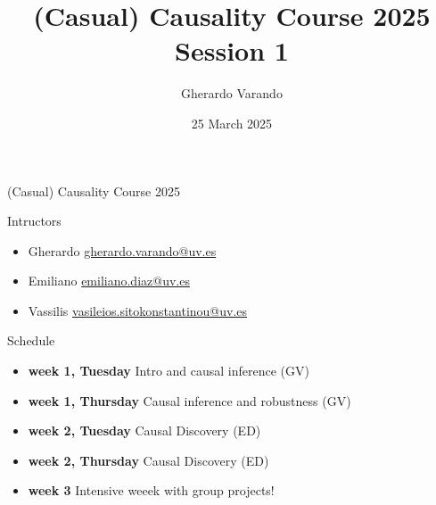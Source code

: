 \documentclass{beamer}
\institute[]{}
\title{(Casual) Causality Course 2025 \\ Session 1}
\author{Gherardo Varando}
\date{25 March 2025}
\begin{document}
\begin{frame}
\maketitle
\end{frame}

\begin{frame}{(Casual) Causality Course 2025}

	\begin{block}{Intructors}
	  \begin{itemize}
	    \item Gherardo \url{gherardo.varando@uv.es}
	    \item Emiliano \url{emiliano.diaz@uv.es} 
	    \item Vassilis \url{vasileios.sitokonstantinou@uv.es}
	  \end{itemize}
	\end{block}
	
	\begin{block}{Schedule} 
         \begin{itemize}
	   \item \textbf{week 1, Tuesday} Intro and causal inference (GV)
	   \item \textbf{week 1, Thursday} Causal inference and robustness (GV)    
	   \item \textbf{week 2, Tuesday} Causal Discovery (ED)
	   \item \textbf{week 2, Thursday} Causal Discovery (ED)
	   \item \textbf{week 3} Intensive weeek with group projects! 
	 \end{itemize}
	\end{block}


\end{frame}
\end{document}

